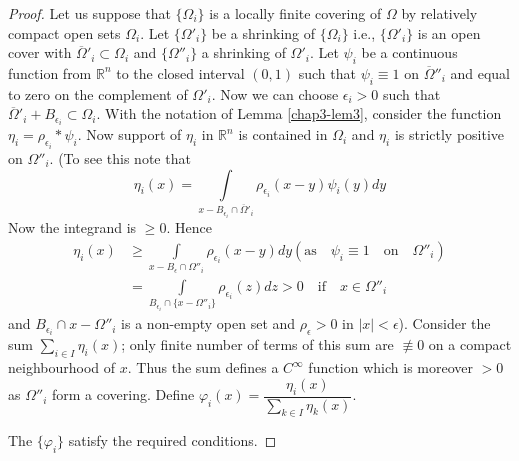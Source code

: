\begin{proof}
Let us suppose that $\{\Omega_{i}\}$ is a locally finite covering of $\Omega$ by relatively compact open sets $\Omega_{i}$. Let $\{\Omega'_{i}\}$ be a shrinking of $\{\Omega_{i}\}$ i.e., $\{\Omega'_{i}\}$ is an open cover with $\overline{\Omega}'_{i}\subset \Omega_{i}$ and $\{\Omega''_{i}\}$ a shrinking of $\Omega'_{i}$. Let $\psi_{i}$ be a continuous function from $\mathbb{R}^{n}$ to the closed interval $(0,1)$ such that $\psi_{i}\equiv 1$ on $\overline{\Omega}''_{i}$ and equal to zero on the complement of $\Omega'_{i}$. Now we can choose $\epsilon_{i}>0$ such that $\overline{\Omega}'_{i}+B_{\epsilon_{i}}\subset \Omega_{i}$. With the notation of Lemma \ref{chap3-lem3}, consider the function $\eta_{i}= \rho_{\epsilon_{i}}\ast \psi_{i}$. Now support of $\eta_{i}$ in $\mathbb{R}^{n}$ is contained in $\Omega_{i}$ and $\eta_{i}$ is strictly positive on $\Omega''_{i}$. (To see this note that
$$
\eta_{i}(x)=\int\limits_{x-B_{\epsilon_{i}}\cap \overline{\Omega}'_{i}}\rho_{\epsilon_{i}}(x-y)\psi_{i}(y)dy
$$
Now the integrand is $\geq 0$. Hence
\begin{align*}
\eta_{i}(x) &\geq \int\limits_{x-B_{\epsilon}\cap \Omega''_{i}}\rho_{\epsilon_{i}}(x-y)dy(\text{as ~ } \psi_{i}\equiv 1 \text{~~ on~~ } \Omega''_{i})\\[4pt]
&= \int\limits_{B_{\epsilon_{i}}\cap \{x-\Omega''_{i}\}}\rho_{\epsilon_{i}}(z)dz>0\quad\text{if}\quad x\in \Omega''_{i}
\end{align*}
and $B_{\epsilon_{i}}\cap x-\Omega''_{i}$ is a non-empty open set and $\rho_{\epsilon}>0$ in $|x|<\epsilon$). Consider the sum $\sum\limits_{i\in I}\eta_{i}(x)$; only finite number of terms of this sum are $\nequiv 0$ on a compact neighbourhood of $x$. Thus the sum defines a $C^{\infty}$ function which is moreover $>0$ as $\Omega''_{i}$ form a covering. Define $\varphi_{i}(x)=\dfrac{\eta_{i}(x)}{\sum\limits_{k\in I}\eta_{k}(x)}$.

The $\{\varphi_{i}\}$ satisfy the required conditions.


\end{proof}
